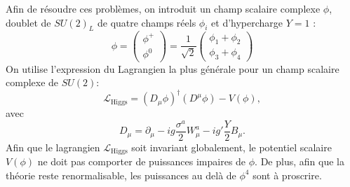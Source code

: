 Afin de résoudre ces problèmes, on introduit un champ scalaire complexe $\phi$, doublet de $SU(2)_{L}$ de quatre champs réels $\phi_{i}$ et d'hypercharge $Y=1$ :
\begin{equation}
\phi=\begin{pmatrix} 
\phi^{+}\\
\phi^{0}
\end{pmatrix}=\frac{1}{\sqrt{2}}\begin{pmatrix} 
\phi_{1}+\phi_{2}\\
\phi_{3}+\phi_{4}
\end{pmatrix}
\end{equation}
On utilise l'expression du Lagrangien la plus générale pour un champ scalaire complexe de $SU(2)$:
\begin{equation}
\mathcal{L}_{\mathrm{Higgs}}=\left(D_{\mu}\phi\right)^{\dagger}\left(D^{\mu}\phi\right)-V(\phi),
\end{equation}
avec 
\begin{equation}
D_{\mu}=\partial_{\mu} -ig\frac{\sigma^a}{2}W_{\mu}^{a}-ig'\frac{Y}{2}B_{\mu}.
\end{equation}
Afin que le lagrangien $\mathcal{L}_{\mathrm{Higgs}}$ soit invariant globalement, le potentiel scalaire $V(\phi)$ ne doit pas comporter de puissances impaires de $\phi$. De plus, afin que la théorie reste renormalisable, les puissances au delà de $\phi^4$ sont à proscrire.

